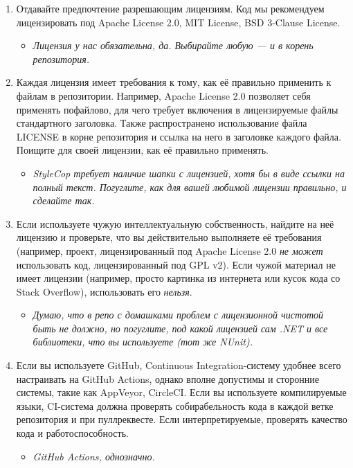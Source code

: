 \documentclass{../../text-style}
\begin{document}
\begin{enumerate}
    \item Отдавайте предпочтение разрешающим лицензиям. Код мы рекомендуем лицензировать под Apache License 2.0, MIT License, BSD 3-Clause License.
    \begin{itemize}
        \item \emph{Лицензия у нас обязательна, да. Выбирайте любую --- и в корень репозитория.}
    \end{itemize}
    \item Каждая лицензия имеет требования к тому, как её правильно применить к файлам в репозитории. Например, Apache License 2.0 позволяет себя применять пофайлово, для чего требует включения в лицензируемые файлы стандартного заголовка. Также распространено использование файла LICENSE в корне репозитория и ссылка на него в заголовке каждого файла. Поищите для своей лицензии, как её правильно применять.
    \begin{itemize}
        \item \emph{StyleCop требует наличие шапки с лицензией, хотя бы в виде ссылки на полный текст. Погуглите, как для вашей любимой лицензии правильно, и сделайте так.}
    \end{itemize}
    \item Если используете чужую интеллектуальную собственность, найдите на неё лицензию и проверьте, что вы действительно выполняете её требования (например, проект, лицензированный под Apache License 2.0 \emph{не может} использовать код, лицензированный под GPL v2). Если чужой материал не имеет лицензии (например, просто картинка из интернета или кусок кода со Stack Overflow), использовать его \emph{нельзя}.
    \begin{itemize}
        \item \emph{Думаю, что в репо с домашками проблем с лицензионной чистотой быть не должно, но погуглите, под какой лицензией сам .NET и все библиотеки, что вы используете (тот же NUnit).}
    \end{itemize}
    \item Если вы используете GitHub, Continuous Integration-систему удобнее всего настраивать на GitHub Actions, однако вполне допустимы и сторонние системы, такие как AppVeyor, CircleCI. Если вы используете компилируемые языки, CI-система должна проверять собирабельность кода в каждой ветке репозитория и при пуллреквесте. Если интерпретируемые, проверять качество кода и работоспособность.
    \begin{itemize}
        \item \emph{GitHub Actions, однозначно.}

\end{itemize}
\end{enumerate}
\end{document}
